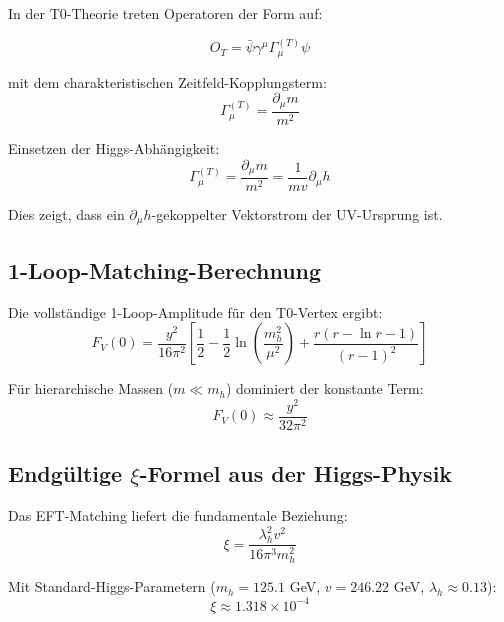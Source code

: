 In der T0-Theorie treten Operatoren der Form auf:

\begin{equation}
	O_T = \bar{\psi}\gamma^\mu\Gamma_\mu^{(T)}\psi
\end{equation}

mit dem charakteristischen Zeitfeld-Kopplungsterm:
\begin{equation}
	\Gamma_\mu^{(T)} = \frac{\partial_\mu m}{m^2}
\end{equation}

Einsetzen der Higgs-Abhängigkeit:
\begin{equation}
	\Gamma_\mu^{(T)} = \frac{\partial_\mu m}{m^2} = \frac{1}{mv}\partial_\mu h
\end{equation}

Dies zeigt, dass ein $\partial_\mu h$-gekoppelter Vektorstrom der UV-Ursprung ist.

\subsection{1-Loop-Matching-Berechnung}
\label{subsec:one_loop_matching}

Die vollständige 1-Loop-Amplitude für den T0-Vertex ergibt:
\begin{equation}
	F_V(0) = \frac{y^2}{16\pi^2}\left[\frac{1}{2} - \frac{1}{2}\ln\left(\frac{m_h^2}{\mu^2}\right) + \frac{r(r-\ln r-1)}{(r-1)^2}\right]
\end{equation}

Für hierarchische Massen ($m \ll m_h$) dominiert der konstante Term:
\begin{equation}
	F_V(0) \approx \frac{y^2}{32\pi^2}
\end{equation}

\subsection{Endgültige $\xi$-Formel aus der Higgs-Physik}
\label{subsec:final_xi_formula}

Das EFT-Matching liefert die fundamentale Beziehung:
\begin{equation}
	\boxed{\xi = \frac{\lambda_h^2 v^2}{16\pi^3 m_h^2}}
\end{equation}

Mit Standard-Higgs-Parametern ($m_h = 125.1$ GeV, $v = 246.22$ GeV, $\lambda_h \approx 0.13$):
\begin{equation}
	\xi \approx 1.318 \times 10^{-4}
\end{equation}

